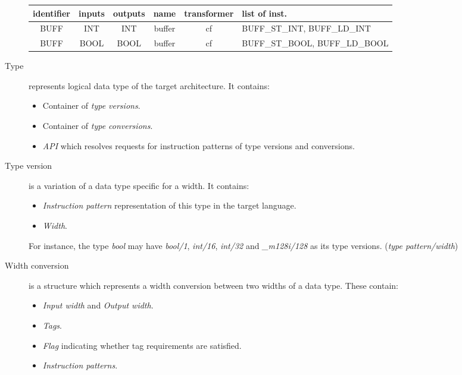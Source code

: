 \begin{description}
    \mybeginfigindent
    \begin{center}
      \begin{tabular}{c|c|c|c|c|p{4cm}}
        identifier & inputs & outputs & name & transformer & list of inst.\\
        \hline
        BUFF & INT & INT & buffer & cf & BUFF\_ST\_INT, BUFF\_LD\_INT \\
        BUFF & BOOL & BOOL & buffer & cf & BUFF\_ST\_BOOL, BUFF\_LD\_BOOL 
      \end{tabular}
    \end{center}
  \item[Type] represents logical data type of the target architecture. It contains:
    \begin{itemize}
      \item Container of \emph{type versions}.
      \item Container of \emph{type conversions}.
      \item \emph{API} which resolves requests for instruction patterns of type versions and conversions.
    \end{itemize}
  \item[Type version] is a variation of a data type specific for a width. It contains:
    \begin{itemize}
      \item \emph{Instruction pattern} representation of this type in the target language.
      \item \emph{Width}.
    \end{itemize}
    For instance, the type \emph{bool} may have \emph{bool/1}, \emph{int/16}, \emph{int/32} and \emph{\_m128i/128}  as its type versions. (\emph{type pattern/width})
  \item[Width conversion] is a structure which represents a width conversion between two widths of a data type. These contain:
    \begin{itemize}
      \item \emph{Input width} and \emph{Output width}.
      \item \emph{Tags}.
      \item \emph{Flag} indicating whether tag requirements are satisfied.
      \item \emph{Instruction patterns}.
    \end{itemize}
\end{description}

